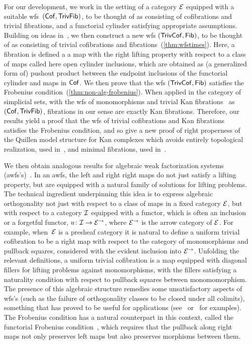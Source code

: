 \documentclass[reqno,10pt,a4paper,oneside,draft]{amsart}
\begin{document}
For our development, we work in the setting of a category $\cal{E}$ equipped with a suitable wfs~$(\Cof, \TrivFib)$, to be thought of as consisting of cofibrations and trivial fibrations, and a functorial cylinder satisfying appropriate assumptions.
Building on ideas in~\cite{cisinski-asterisque}, we then construct a new wfs $(\TrivCof, \Fib)$, to be thought of as consisting of  trivial cofibrations and fibrations~(\cref{thm:wfstimes}). Here, a fibration is defined a a map with the right lifting property with respect to a class of maps called here open cylinder inclusions, which are obtained as (a generalized form of) pushout product between the endpoint inclusions of the functorial cylinder and maps in $\Cof$.  We then prove that the wfs $(\TrivCof, \Fib)$ satisfies the Frobenius condition~(\cref{thm:non-alg-frobenius}).
When applied in the category of simplicial sets, with the wfs of monomorphisms and trivial Kan fibrations~\cite{quillen-homotopical} as $(\Cof, \TrivFib)$, fibrations in our sense are exactly Kan fibrations.
Therefore, our results yield a proof that the wfs of trivial cofibrations and Kan fibrations satisfies the Frobenius condition, and so give a new proof of right properness of the Quillen model structure for Kan complexes which avoids entirely topological realization, used in~\cite{hovey-model-categories}, and minimal fibrations, used in~\cite{joyal-tierney:simplicial-homotopy-theory}.

We then obtain analogous results for algebraic weak factorization systems (awfs's)~\cite{garner:small-object-argument,grandis-tholen-nwfs}.
In an awfs, the left and right right maps do not just satisfy a lifting property, but are equipped with a natural family of solutions for lifting problems.
The technical ingredient underpinning this idea is to express algebraic orthogonality not just with respect to a class of maps in a fixed category $\cal{E}$, but with respect to a category $\cal{I}$ equipped with a functor, which is often an inclusion or a forgetful functor, $u \co \cal{I} \to \cal{E}^\to$, where $\cal{E}^\to$ is the arrow category of $\cal{E}$.
For example, when~$\cal{E}$ is a presheaf category it is natural to define a uniform trivial cofibration to be a right map with respect to the category of monomorphisms and pullback squares, considered with the evident inclusion into $\cal{E}^\to$.
Unfolding the relevant definitions, a uniform trivial cofibration is a map equipped with diagonal fillers for lifting problems against monomorphisms, with the fillers satisfying a naturality condition with respect to pullback squares between monomomorphism.
The presence of this algebraic structure remedies some unsatisfactory aspects of wfs's (such as the failure of orthogonality classes to be closed under all colimits), something that has proved to be useful for applications (see~\cite{batanin-cisinski-weber,garner:globular-operator-awfs,garner-homomorphisms} or~\cite{awodey-cubical,coquand-cubical-sets,cohen-et-al:cubicaltt,pitts-cubical-nominal,swan-awfs} for examples).
The Frobenius condition has a natural counterpart in this context, called the functorial Frobenius condition~\cite{garner:topological-simplicial}, which requires that the pullback along right maps not only preserves left maps but also preserves morphisms between them.
\end{document}
